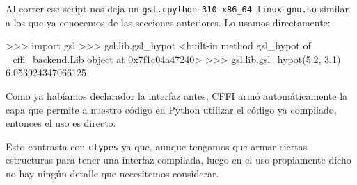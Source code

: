 Al correr ese script nos deja un \texttt{gsl.cpython-310-x86\_64-linux-gnu.so} similar a los que ya conocemos de las secciones anteriores. Lo usamos directamente:

\begin{py}
>>> import gsl
>>> gsl.lib.gsl_hypot
<built-in method gsl_hypot of _cffi_backend.Lib object at 0x7f1c04a47240>
>>> gsl.lib.gsl_hypot(5.2, 3.1)
6.053924347066125
\end{py}

Como ya habíamos declarador la interfaz antes, CFFI armó automáticamente la capa que permite a nuestro código en Python utilizar el código ya compilado, entonces el uso es directo.

Esto contrasta con \texttt{ctypes} ya que, aunque tengamos que armar ciertas estructuras para tener una interfaz compilada, luego en el uso propiamente dicho no hay ningún detalle que necesitemos considerar.
